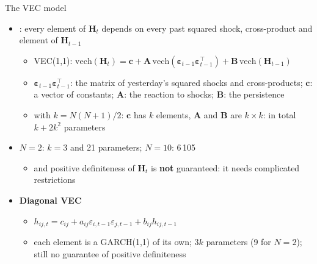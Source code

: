\begin{frame}{The VEC model}
\itemsize{\footnotesize}
\begin{itemize}
    \item {}: every element of $\mathbf{H}_t$ depends on every past squared shock, cross-product and element of $\mathbf{H}_{t-1}$
    \begin{itemize}
        \item VEC(1,1): $\mathrm{vech}(\mathbf{H}_t) = \mathbf{c} + \mathbf{A}\,\mathrm{vech}(\boldsymbol{\varepsilon}_{t-1}\boldsymbol{\varepsilon}_{t-1}^\top) + \mathbf{B}\,\mathrm{vech}(\mathbf{H}_{t-1})$
        \item $\boldsymbol{\varepsilon}_{t-1}\boldsymbol{\varepsilon}_{t-1}^\top$: the matrix of yesterday's squared shocks and cross-products; $\mathbf{c}$: a vector of constants; $\mathbf{A}$: the reaction to shocks; $\mathbf{B}$: the persistence
        \item with $k = N(N+1)/2$: $\mathbf{c}$ has $k$ elements, $\mathbf{A}$ and $\mathbf{B}$ are $k \times k$: in total $k + 2k^2$ parameters
    \end{itemize}
    \item $N = 2$: $k = 3$ and 21 parameters; $N = 10$: 6\,105
    \begin{itemize}
        \item and positive definiteness of $\mathbf{H}_t$ is \textbf{not} guaranteed: it needs complicated restrictions
    \end{itemize}
    \item \textbf{Diagonal VEC}
    \begin{itemize}
        \item $h_{ij,t} = c_{ij} + a_{ij}\varepsilon_{i,t-1}\varepsilon_{j,t-1} + b_{ij}h_{ij,t-1}$
        \item each element is a GARCH(1,1) of its own; $3k$ parameters (9 for $N = 2$); still no guarantee of positive definiteness
    \end{itemize}
\end{itemize}
\end{frame}

